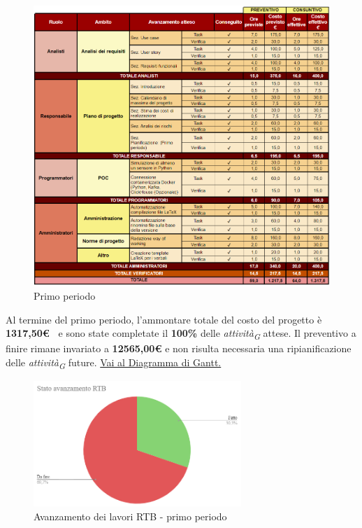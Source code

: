 \begin{figure}[H]
    \centering
    \includegraphics[height=0.9\textwidth]{../Images/periodo1.PNG}
    \caption{Primo periodo}
    \label{fig:Primo_periodo}
\end{figure}


Al termine del primo periodo, l'ammontare totale del costo del progetto è \textbf{ 1317,50\euro\ } e sono state completate il \textbf{100\%} delle \textit{attività}\textsubscript{\textit{G}} attese.
Il preventivo a finire rimane invariato a \textbf{12565,00€} e non risulta necessaria una ripianificazione delle \textit{attività}\textsubscript{\textit{G}} future.
\href{https://github.com/orgs/ByteOps-swe/projects/3/views/1?sortedBy%5Bdirection%5D=asc&sortedBy%5BcolumnId%5D=64182560}{Vai al Diagramma di Gantt.}

\pagebreak

\begin{figure}[H]
    \centering
    \begin{minipage}[b]{0.70\textwidth}
        \centering
        \includegraphics[width=0.7\textwidth]{../Images/avanzamento1Periodo.png}
        \caption{Avanzamento dei lavori RTB - primo periodo}
        \label{fig:Avanzamento_RTB_1}
    \end{minipage}
\end{figure}

